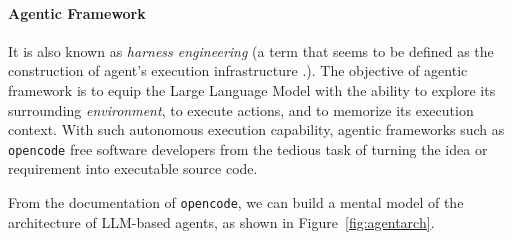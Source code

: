 \paragraph*{Agentic Framework} It is also known as \textit{harness engineering}
(a term that seems to be defined as the construction of
agent's execution infrastructure \citep{harnessengineeringalgorithm}.).
The objective of agentic framework is to equip the Large Language Model
with the ability to explore its surrounding \textit{environment},
to execute actions, and to memorize its execution context.
With such autonomous execution capability,
agentic frameworks such as \texttt{opencode} free software developers
from the tedious task of turning the idea or requirement into
executable source code.

\par From the documentation of \texttt{opencode}\citep{opencode},
we can build a mental model of the architecture of LLM-based
agents, as shown in Figure~\ref{fig:agentarch}.


